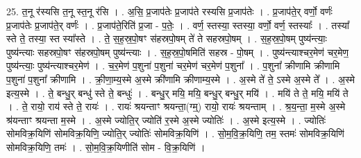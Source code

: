 \documentclass[17pt]{extarticle}
\begin{document}
25. त॒नू र॑स्यसि त॒नू स्त॒नू र॑सि । . अ॒सि॒ प्र॒जाप॑तेः प्र॒जाप॑ते रस्यसि प्र॒जाप॑तेः । . प्र॒जाप॑ते॒र् वर्णो॒ वर्णः॑ प्र॒जाप॑तेः प्र॒जाप॑ते॒र् वर्णः॑ । . प्र॒जाप॑ते॒रिति॑ प्र॒जा - प॒तेः॒ । . वर्ण॒ स्तस्या॒ स्तस्या॒ वर्णो॒ वर्ण॒ स्तस्याः᳚ । . तस्या᳚ स्ते ते॒ तस्या॒ स्त स्या᳚स्ते । . ते॒ स॒ह॒स्र॒पो॒षꣳ स॑हस्रपो॒षम् ते॑ ते सहस्रपो॒षम् । . स॒ह॒स्र॒पो॒षम् पुष्य॑न्त्याः॒ पुष्य॑न्त्याः सहस्रपो॒षꣳ स॑हस्रपो॒षम् पुष्य॑न्त्याः । . स॒ह॒स्र॒पो॒षमिति॑ सहस्र - पो॒षम् । . पुष्य॑न्त्याश्चर॒मेण॑ चर॒मेण॒ पुष्य॑न्त्याः॒ पुष्य॑न्त्याश्चर॒मेण॑ । . च॒र॒मेण॑ प॒शुना॑ प॒शुना॑ चर॒मेण॑ चर॒मेण॑ प॒शुना᳚ । . प॒शुना᳚ क्रीणामि क्रीणामि प॒शुना॑ प॒शुना᳚ क्रीणामि । . क्री॒णा॒म्य॒स्मे अ॒स्मे क्री॑णामि क्रीणाम्य॒स्मे । . अ॒स्मे ते॑ ते॒ ऽस्मे अ॒स्मे ते᳚ । . अ॒स्मे इत्य॒स्मे । . ते॒ बन्धु॒र् बन्धु॑ स्ते ते॒ बन्धुः॑ । . बन्धु॒र् मयि॒ मयि॒ बन्धु॒र् बन्धु॒र् मयि॑ । . मयि॑ ते ते॒ मयि॒ मयि॑ ते । . ते॒ रायो॒ राय॑ स्ते ते॒ रायः॑ । . रायः॑ श्रयन्ताꣳ श्रयन्ता॒(ग्म्॒) रायो॒ रायः॑ श्रयन्ताम् । . श्र॒य॒न्ता॒ म॒स्मे अ॒स्मे श्र॑यन्ताꣳ श्रयन्ता म॒स्मे । . अ॒स्मे ज्योति॒र् ज्योति॑ र॒स्मे अ॒स्मे ज्योतिः॑ । . अ॒स्मे इत्य॒स्मे । . ज्योतिः॑ सोमविक्र॒यिणि॑ सोमविक्र॒यिणि॒ ज्योति॒र् ज्योतिः॑ सोमविक्र॒यिणि॑ । . सो॒म॒वि॒क्र॒यिणि॒ तम॒ स्तमः॑ सोमविक्र॒यिणि॑ सोमविक्र॒यिणि॒ तमः॑ । . सो॒म॒वि॒क्र॒यिणीति॑ सोम - वि॒क्र॒यिणि॑ । \newline
\end{document}
